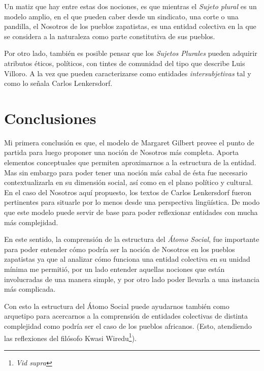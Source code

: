 \documentclass[oneside]{book}
\begin{document}
Un matiz que hay entre estas dos nociones, es que mientras el \textit{Sujeto plural} es un modelo amplio, en el que pueden caber desde un sindicato, una corte o una pandilla, el Nosotros de los pueblos zapatistas, es una entidad colectiva en la que se considera a la naturaleza como parte constitutiva de sus pueblos.
	
Por otro lado, también es posible pensar que los \textit{Sujetos Plurales} pueden adquirir atributos éticos, políticos, con tintes de comunidad del tipo que describe Luis Villoro. A la vez que pueden caracterizarse como entidades \textit{intersubjetivas} tal y como lo señala Carlos Lenkersdorf.
	
\chapter*{Conclusiones}


Mi primera conclusión es que, el modelo de Margaret Gilbert provee el punto de partida para luego proponer una noción de Nosotros más completa. Aporta elementos conceptuales que permiten aproximarnos a la estructura de la entidad. Mas sin embargo para poder tener una noción más cabal de ésta fue necesario contextualizarla en su dimensión social, así como en el plano político y cultural. En el caso del Nosotros aquí propuesto, los textos de Carlos Lenkersdorf fueron pertinentes para situarle por lo menos desde una perspectiva lingüística. De modo que este modelo puede servir de base para poder reflexionar entidades con mucha más complejidad.

En este sentido, la comprensión de la estructura del \textit{Átomo Social}, fue importante para poder entender cómo podría ser la noción de Nosotros en los pueblos zapatistas ya que al analizar cómo funciona una entidad colectiva en su unidad mínima me permitió, por un lado entender aquellas nociones que están involucradas de una manera simple, y por otro lado poder llevarla a una instancia más complicada.

Con esto la estructura del Átomo Social puede ayudarnos también como arquetipo para acercarnos a la comprensión de entidades colectivas de distinta complejidad como podría ser el caso de los pueblos africanos. (Esto, atendiendo las reflexiones del filósofo Kwasi Wiredu\footnote{\textit{Vid supra}}).
\end{document}
